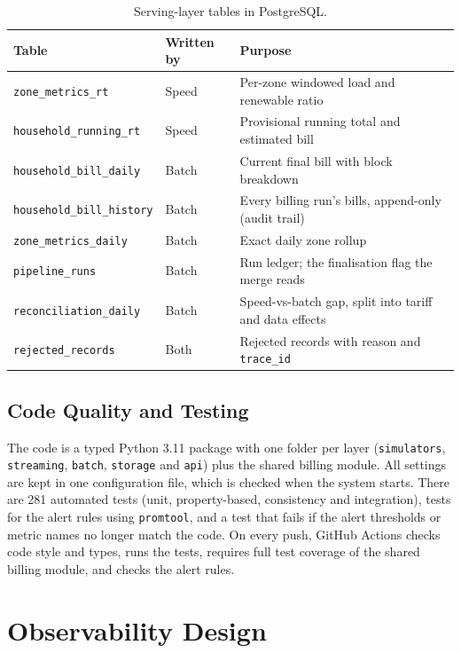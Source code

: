 \documentclass[11pt,a4paper]{article}
\begin{document}
\begin{table}[!htbp]
\centering
\caption{Serving-layer tables in PostgreSQL.}
\label{tab:tables}
\small
\begin{tabularx}{\textwidth}{L{4.4cm} L{1.6cm} X}
\toprule
\textbf{Table} & \textbf{Written by} & \textbf{Purpose} \\
\midrule
\texttt{zone\_metrics\_rt} & Speed & Per-zone windowed load and renewable ratio \\
\texttt{household\_running\_rt} & Speed & Provisional running total and estimated bill \\
\texttt{household\_bill\_daily} & Batch & Current final bill with block breakdown \\
\texttt{household\_bill\_history} & Batch & Every billing run's bills, append-only (audit trail) \\
\texttt{zone\_metrics\_daily} & Batch & Exact daily zone rollup \\
\texttt{pipeline\_runs} & Batch & Run ledger; the finalisation flag the merge reads \\
\texttt{reconciliation\_daily} & Batch & Speed-vs-batch gap, split into tariff and data effects \\
\texttt{rejected\_records} & Both & Rejected records with reason and \texttt{trace\_id} \\
\bottomrule
\end{tabularx}
\end{table}

\subsection{Code Quality and Testing}

The code is a typed Python 3.11 package with one folder per layer (\texttt{simulators},
\texttt{streaming}, \texttt{batch}, \texttt{storage} and \texttt{api}) plus the shared
billing module. All settings are kept in one configuration file, which is checked when the
system starts. There are 281 automated tests (unit, property-based, consistency and
integration), tests for the alert rules using \texttt{promtool}, and a test that fails if the
alert thresholds or metric names no longer match the code. On every push, GitHub Actions
checks code style and types, runs the tests, requires full test coverage of the shared
billing module, and checks the alert rules.

\section{Observability Design}
\label{sec:observability}
\end{document}
